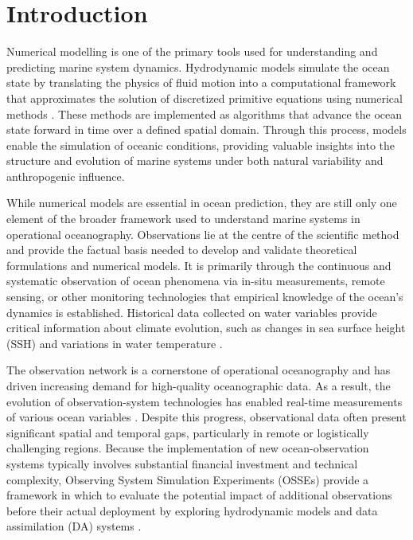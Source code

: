 \section{Introduction} \label{sec:ossedesign_intro}
Numerical modelling is one of the primary tools used for understanding and predicting marine system dynamics. Hydrodynamic models simulate the ocean state by translating the physics of fluid motion into a computational framework that approximates the solution of discretized primitive equations using numerical methods \parencite{versteeg2007introduction, griffies2006some}. These methods are implemented as algorithms that advance the ocean state forward in time over a defined spatial domain. Through this process, models enable the simulation of oceanic conditions, providing valuable insights into the structure and evolution of marine systems under both natural variability and anthropogenic influence.

While numerical models are essential in ocean prediction, they are still only one element of the broader framework used to understand marine systems in operational oceanography. Observations lie at the centre of the scientific method and provide the factual basis needed to develop and validate theoretical formulations and numerical models. It is primarily through the continuous and systematic observation of ocean phenomena via in-situ measurements, remote sensing, or other monitoring technologies \parencite{letraon2011satellites} that empirical knowledge of the ocean's dynamics is established. Historical data collected on water variables provide critical information about climate evolution, such as changes in sea surface height (SSH) \parencite{frederikse2020causes, gomez2024satellite} and variations in water temperature \parencite{mills2024baseline, liu2023twenty}.

The observation network is a cornerstone of operational oceanography and has driven increasing demand for high-quality oceanographic data. As a result, the evolution of observation-system technologies has enabled real-time measurements of various ocean variables \parencite{legler2015current, letraon2015use}. Despite this progress, observational data often present significant spatial and temporal gaps, particularly in remote or logistically challenging regions. Because the implementation of new ocean-observation systems typically involves substantial financial investment and technical complexity, Observing System Simulation Experiments (OSSEs) provide a framework in which to evaluate the potential impact of additional observations before their actual deployment by exploring hydrodynamic models and data assimilation (DA) systems \parencite{prive2023robustness}.


